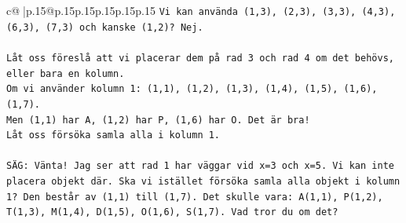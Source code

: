 \documentclass{article}
\begin{document}
{\begin{supertabular}{c@{$\;$}|p{.15\linewidth}@{}p{.15\linewidth}p{.15\linewidth}p{.15\linewidth}p{.15\linewidth}p{.15\linewidth}}
{{{\texttt{Vi kan använda (1,3), (2,3), (3,3), (4,3), (6,3), (7,3) och kanske (1,2)? Nej.} \\
\\ 
\texttt{Låt oss föreslå att vi placerar dem på rad 3 och rad 4 om det behövs, eller bara en kolumn.} \\
\texttt{Om vi använder kolumn 1: (1,1), (1,2), (1,3), (1,4), (1,5), (1,6), (1,7).} \\
\texttt{Men (1,1) har A, (1,2) har P, (1,6) har O. Det är bra!} \\
\texttt{Låt oss försöka samla alla i kolumn 1.} \\
\\ 
\texttt{SÄG: Vänta! Jag ser att rad 1 har väggar vid x=3 och x=5. Vi kan inte placera objekt där. Ska vi istället försöka samla alla objekt i kolumn 1? Den består av (1,1) till (1,7). Det skulle vara: A(1,1), P(1,2), T(1,3), M(1,4), D(1,5), O(1,6), S(1,7). Vad tror du om det?} \\
            }
        }
    }
     \\ \\


\end{supertabular}}
\end{document}
